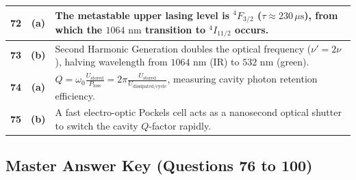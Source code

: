 {\begin{tabularx}{\textwidth}{|c|c|X|}
\textbf{72} & \textbf{(a)} & The metastable upper lasing level is $^4F_{3/2}$ ($\tau \approx 230\,\mu\text{s}$), from which the $1064\text{ nm}$ transition to $^4I_{11/2}$ occurs. \\ \hline
\textbf{73} & \textbf{(b)} & Second Harmonic Generation doubles the optical frequency ($\nu' = 2\nu$), halving wavelength from $1064\text{ nm}$ (IR) to $532\text{ nm}$ (green). \\ \hline
\textbf{74} & \textbf{(a)} & $Q = \omega_0 \frac{U_{\text{stored}}}{P_{\text{loss}}} = 2\pi \frac{U_{\text{stored}}}{U_{\text{dissipated/cycle}}}$, measuring cavity photon retention efficiency. \\ \hline
\textbf{75} & \textbf{(b)} & A fast electro-optic Pockels cell acts as a nanosecond optical shutter to switch the cavity $Q$-factor rapidly. \\ \hline
\end{tabularx}
}

\newpage

\subsection*{Master Answer Key (Questions 76 to 100)}

